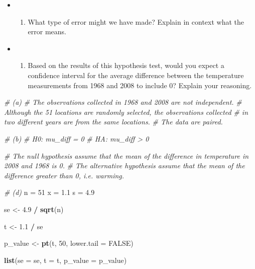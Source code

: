 \documentclass[]{book}
\newenvironment{Shaded}{\begin{snugshade}}{\end{snugshade}}
\newcommand{\CommentTok}[1]{\textcolor[rgb]{0.56,0.35,0.01}{\textit{#1}}}
\newcommand{\DataTypeTok}[1]{\textcolor[rgb]{0.13,0.29,0.53}{#1}}
\newcommand{\DecValTok}[1]{\textcolor[rgb]{0.00,0.00,0.81}{#1}}
\newcommand{\FloatTok}[1]{\textcolor[rgb]{0.00,0.00,0.81}{#1}}
\newcommand{\KeywordTok}[1]{\textcolor[rgb]{0.13,0.29,0.53}{\textbf{#1}}}
\newcommand{\NormalTok}[1]{#1}
\newcommand{\OperatorTok}[1]{\textcolor[rgb]{0.81,0.36,0.00}{\textbf{#1}}}
\newcommand{\OtherTok}[1]{\textcolor[rgb]{0.56,0.35,0.01}{#1}}
\newcommand{\StringTok}[1]{\textcolor[rgb]{0.31,0.60,0.02}{#1}}
\providecommand{\tightlist}{%
  \setlength{\itemsep}{0pt}\setlength{\parskip}{0pt}}
\begin{document}
\begin{itemize}
\item
  \begin{enumerate}
  \def\labelenumi{(\alph{enumi})}
  \setcounter{enumi}{5}
  \tightlist
  \item
    What type of error might we have made? Explain in context what the error means.
  \end{enumerate}
\item
  \begin{enumerate}
  \def\labelenumi{(\alph{enumi})}
  \setcounter{enumi}{6}
  \tightlist
  \item
    Based on the results of this hypothesis test, would you expect a confidence interval for the average difference between the temperature measurements from 1968 and 2008 to include 0? Explain your reasoning.
  \end{enumerate}
\end{itemize}

\begin{Shaded}
\begin{Highlighting}[]
\CommentTok{# (a)}
\CommentTok{# The observations collected in 1968 and 2008 are not independent. }
\CommentTok{# Although the 51 locations are randomly selected, the observations collected}
\CommentTok{# in two different years are from the same locations.}
\CommentTok{# The data are paired.}
\end{Highlighting}
\end{Shaded}

\begin{Shaded}
\begin{Highlighting}[]
\CommentTok{# (b)}
\CommentTok{# H0: mu_diff = 0}
\CommentTok{# HA: mu_diff > 0}

\CommentTok{# The null hypothesis assume that the mean of the difference in temperature in 2008 and 1968 is 0.}
\CommentTok{# The alternative hypothesis assume that the mean of the difference greater than 0, i.e. warming.}
\end{Highlighting}
\end{Shaded}

\begin{Shaded}
\begin{Highlighting}[]
\CommentTok{# (d)}
\NormalTok{n =}\StringTok{ }\DecValTok{51}
\NormalTok{x =}\StringTok{ }\FloatTok{1.1}
\NormalTok{s =}\StringTok{ }\FloatTok{4.9}

\NormalTok{se <-}\StringTok{ }\FloatTok{4.9} \OperatorTok{/}\StringTok{ }\KeywordTok{sqrt}\NormalTok{(n)}

\NormalTok{t <-}\StringTok{ }\FloatTok{1.1} \OperatorTok{/}\StringTok{ }\NormalTok{se}

\NormalTok{p_value <-}\StringTok{ }\KeywordTok{pt}\NormalTok{(t, }\DecValTok{50}\NormalTok{, }\DataTypeTok{lower.tail =} \OtherTok{FALSE}\NormalTok{) }

\KeywordTok{list}\NormalTok{(}\DataTypeTok{se =}\NormalTok{ se, }\DataTypeTok{t =}\NormalTok{ t, }\DataTypeTok{p_value =}\NormalTok{ p_value)}
\end{Highlighting}
\end{Shaded}
\end{document}

